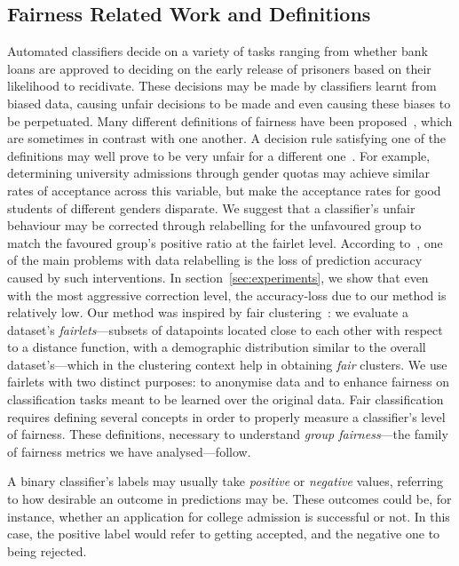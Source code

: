 \documentclass[runningheads]{llncs}
\begin{document}
\subsection{Fairness Related Work and Definitions}
Automated classifiers decide on a variety of tasks ranging from whether bank loans are approved to deciding on the early release of prisoners based on their likelihood to recidivate. These decisions may be made by classifiers learnt from biased data, causing unfair decisions to be made and even causing these biases to be perpetuated.
%
%
Many different definitions of fairness have been proposed~\cite{kusner2017counterfactual}, which are sometimes in contrast with one another. A decision rule satisfying one of the definitions may well prove to be very unfair for a different one~\cite{chouldechova2017fair}. For example, determining university admissions through gender quotas may achieve similar rates of acceptance across this variable, but make the acceptance rates for good students of different genders disparate. We suggest that a classifier's unfair behaviour may be corrected through relabelling for the unfavoured group to match the favoured group's positive ratio at the fairlet level. According to~\cite{berk2018fairness}, one of the main problems with data relabelling is the loss of prediction accuracy caused by such interventions. In section~\ref{sec:experiments}, we show that even with the most aggressive correction level, the accuracy-loss due to our method is relatively low. Our method was inspired by fair clustering~\cite{Chierichetti:2017,backurs2019scalable}: we evaluate a dataset's \emph{fairlets}---subsets of datapoints located close to each other with respect to a distance function, with a demographic distribution similar to the overall dataset's---which in the clustering context help in obtaining \emph{fair} clusters. We use fairlets with two distinct purposes: to anonymise data and to enhance fairness on classification tasks meant to be learned over the original data. Fair classification requires defining several concepts in order to properly measure a classifier's level of fairness. These definitions, necessary to understand \emph{group fairness}---the family of fairness metrics we have analysed---follow.

\begin{definition}
  A binary classifier's labels may usually take \emph{positive} or \emph{negative} values, referring to how desirable an outcome in predictions may be. These outcomes could be, for instance, whether an application for college admission is successful or not. In this case, the positive label would refer to getting accepted, and the negative one to being rejected.
\end{definition}
\end{document}

